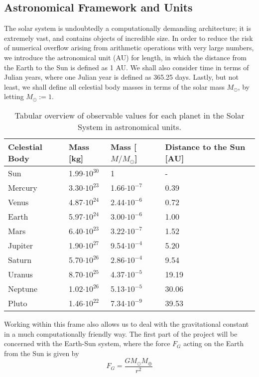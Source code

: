 	\subsection{Astronomical Framework and Units}
	The solar system is undoubtedly a computationally demanding architecture; it is extremely vast, and contains objects of incredible size. In order to reduce the risk of numerical overflow arising from arithmetic operations with very large numbers, we introduce the astronomical unit (AU) for length, in which the distance from the Earth to the Sun is defined as 1 AU. We shall also consider time in terms of Julian years, where one Julian year is defined as 365.25 days. Lastly, but not least, we shall define all celestial body masses in terms of the solar mass $M_\odot$, by letting $M_\odot := 1$.
	\begin{table}[H]
		\centering
		\caption{Tabular overview of observable values for each planet in the Solar System in astronomical units.}
		\label{tab2}
		\begin{tabular}{l|l|l|l}
			\hline
			Celestial Body & Mass [kg] & Mass [$M/M_\odot$] & Distance to the Sun [AU]\\
			\hline
			Sun & 1.99$\cdot 10^{30}$& 1 & -\\
			Mercury & 3.30$\cdot10^{23}$ &1.66$\cdot10^{-7}$ &0.39\\
			Venus & 4.87$\cdot10^{24}$&2.44$\cdot10^{-6}$ &0.72\\
			Earth & 5.97$\cdot 10^{24}$&3.00$\cdot10^{-6}$ &1.00\\
			Mars &6.40$\cdot10^{23}$ &3.22$\cdot10^{-7}$ &1.52\\
			Jupiter &1.90$\cdot10^{27}$ &9.54$\cdot10^{-4}$ &5.20\\
			Saturn &5.70$\cdot10^{26}$ &2.86$\cdot10^{-4}$ &9.54\\
			Uranus &8.70$\cdot10^{25}$ &4.37$\cdot10^{-5}$ &19.19\\
			Neptune &1.02$\cdot10^{26}$ &5.13$\cdot10^{-5}$ &30.06\\
			Pluto &1.46$\cdot10^{22}$ & 7.34$\cdot10^{-9}$&39.53
		\end{tabular}
	\end{table}
	Working within this frame also allows us to deal with the gravitational constant in a much computationally friendly way. The first part of the project will be concerned with the Earth-Sun system, where the force $F_G$ acting on the Earth from the Sun is given by
	\begin{equation}
		F_G = \frac{GM_\odot M_\oplus}{r^2}
	\end{equation}
